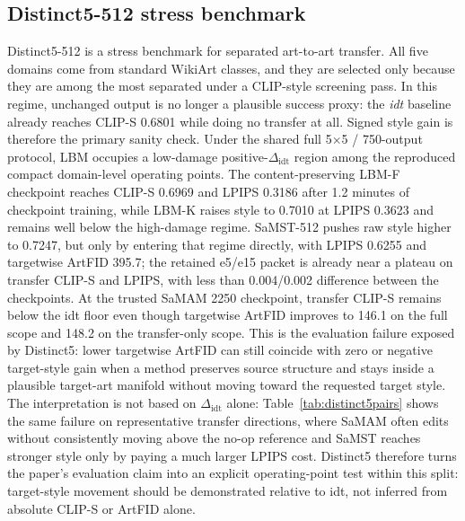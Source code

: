 \documentclass[letterpaper]{article}
\begin{document}
\subsection{Distinct5-512 stress benchmark}
Distinct5-512 is a stress benchmark for separated art-to-art transfer. All five domains come from standard WikiArt classes, and they are selected only because they are among the most separated under a CLIP-style screening pass. In this regime, unchanged output is no longer a plausible success proxy: the \emph{idt} baseline already reaches CLIP-S 0.6801 while doing no transfer at all. Signed style gain is therefore the primary sanity check. Under the shared full 5$\times$5 / 750-output protocol, LBM occupies a low-damage positive-$\Delta_{\mathrm{idt}}$ region among the reproduced compact domain-level operating points. The content-preserving LBM-F checkpoint reaches CLIP-S 0.6969 and LPIPS 0.3186 after 1.2 minutes of checkpoint training, while LBM-K raises style to 0.7010 at LPIPS 0.3623 and remains well below the high-damage regime. SaMST-512 pushes raw style higher to 0.7247, but only by entering that regime directly, with LPIPS 0.6255 and targetwise ArtFID 395.7; the retained e5/e15 packet is already near a plateau on transfer CLIP-S and LPIPS, with less than 0.004/0.002 difference between the checkpoints. At the trusted SaMAM 2250 checkpoint, transfer CLIP-S remains below the idt floor even though targetwise ArtFID improves to 146.1 on the full scope and 148.2 on the transfer-only scope. This is the evaluation failure exposed by Distinct5: lower targetwise ArtFID can still coincide with zero or negative target-style gain when a method preserves source structure and stays inside a plausible target-art manifold without moving toward the requested target style. The interpretation is not based on $\Delta_{\mathrm{idt}}$ alone: Table~\ref{tab:distinct5pairs} shows the same failure on representative transfer directions, where SaMAM often edits without consistently moving above the no-op reference and SaMST reaches stronger style only by paying a much larger LPIPS cost. Distinct5 therefore turns the paper's evaluation claim into an explicit operating-point test within this split: target-style movement should be demonstrated relative to idt, not inferred from absolute CLIP-S or ArtFID alone.
\end{document}
